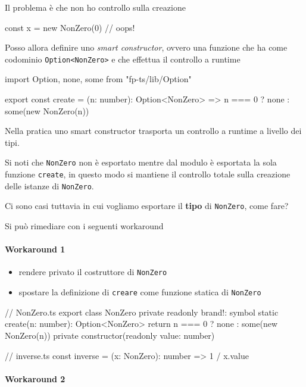 \documentclass[12pt]{article}
\theoremstyle{definition}
\newenvironment{code}
  {\vspace{0.5cm} \VerbatimEnvironment\begin{typescriptcode}}
  {\end{typescriptcode} \vspace{0.2cm}}
\begin{document}
Il problema è che non ho controllo sulla creazione

\begin{code}
const x = new NonZero(0) // oops!
\end{code}

Posso allora definire uno \emph{smart constructor}, ovvero una funzione che ha come codominio \texttt{Option<NonZero>} e che
effettua il controllo a runtime

\begin{code}
import { Option, none, some } from "fp-ts/lib/Option"

export const create = (n: number): Option<NonZero> =>
  n === 0 ? none : some(new NonZero(n))
\end{code}

Nella pratica uno smart constructor trasporta un controllo a runtime a livello dei tipi.

Si noti che \texttt{NonZero} non è esportato mentre dal modulo è esportata la sola funzione \texttt{create}, in questo
modo si mantiene il controllo totale sulla creazione delle istanze di \texttt{NonZero}.

Ci sono casi tuttavia in cui vogliamo esportare il \textbf{tipo} di \texttt{NonZero}, come fare?

Si può rimediare con i seguenti workaround

\paragraph{Workaround 1}

\begin{itemize}
\item rendere privato il costruttore di \texttt{NonZero}
\item spostare la definizione di \texttt{creare} come funzione statica di \texttt{NonZero}
\end{itemize}

\begin{code}
// NonZero.ts
export class NonZero {
  private readonly brand!: symbol
  static create(n: number): Option<NonZero> {
    return n === 0 ? none : some(new NonZero(n))
  }
  private constructor(readonly value: number) {}
}

// inverse.ts
const inverse = (x: NonZero): number => 1 / x.value
\end{code}

\paragraph{Workaround 2}
\end{document}
